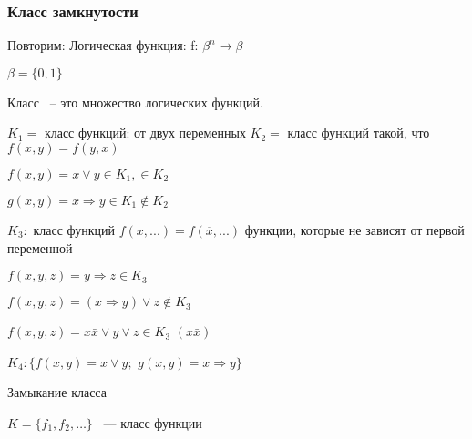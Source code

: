 \documentclass[russian]{lecture-notes}
\begin{document}
	\subsubsection{Класс замкнутости}

	Повторим: Логическая функция: f: $\beta^{n} \rightarrow \beta$

	$\beta = \{0,1\}$

	\begin{definition}
		Класс ~-- это множество логических функций.
	\end{definition}

	\begin{example}

		$K_{1} = $ класс функций: от двух переменных
		$K_{2} = $ класс функций такой, что $f(x,y) = f(y,x)$

		$f(x,y) = x \lor y \in K_{1}, \in K_{2}$

		$g(x,y) = x \Rightarrow y \in K_{1} \notin K_{2}$

		$K_{3}:$ класс функций $f(x,...) = f(\overline{x}, ...)$
		функции, которые не зависят от первой переменной

		$f(x,y,z) = y \Rightarrow z \in K_{3}$

		$f(x,y,z) = (x \Rightarrow y) \lor z \notin K_{3}$

		$f(x,y,z) = x\bar{x} \lor y \lor z \in K_{3}$ \quad $(x \bar{x})$

		$K_{4}: \{f(x,y) = x \lor y;$  $ g(x,y) = x \Rightarrow y\}$

		\end{example}

		\begin{definition}
			Замыкание класса

			$K = \{f_{1},f_{2},\dots\}$ ~--- класс функции

			\end{definition}
\end{document}
